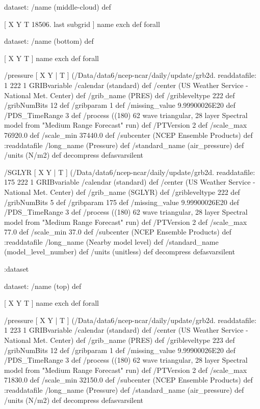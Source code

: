 \begin{ingrid}

 dataset: /name (middle-cloud) def

  [ X Y T 18506. last subgrid ] { name exch def } forall

  dataset: /name (bottom) def

   [ X Y T ] { name exch def } forall

   /pressure { [ X Y | T ] (/Data/data6/ncep-ncar/daily/update/grb2d.%
   readdatafile:
   1 222 1 GRIBvariable
   /calendar (standard) def
   /center (US Weather Service - National Met. Center) def
   /grib_name (PRES) def
   /gribleveltype 222 def
   /gribNumBits 12 def
   /gribparam 1 def
   /missing_value 9.99900026E20 def
   /PDS_TimeRange 3 def
   /process ((180) 62 wave triangular, 28 layer Spectral model from "Medium Range Forecast" run) def
   /PTVersion 2 def
   /scale_max 76920.0 def
   /scale_min 37440.0 def
   /subcenter (NCEP Ensemble Products) def
   :readdatafile
   /long_name (Pressure) def
   /standard_name (air_pressure) def
   /units (N/m2) def
   decompress
   } defasvarsilent

   /SGLYR { [ X Y | T ] (/Data/data6/ncep-ncar/daily/update/grb2d.%
   readdatafile:
   175 222 1 GRIBvariable
   /calendar (standard) def
   /center (US Weather Service - National Met. Center) def
   /grib_name (SGLYR) def
   /gribleveltype 222 def
   /gribNumBits 5 def
   /gribparam 175 def
   /missing_value 9.99900026E20 def
   /PDS_TimeRange 3 def
   /process ((180) 62 wave triangular, 28 layer Spectral model from "Medium Range Forecast" run) def
   /PTVersion 2 def
   /scale_max 77.0 def
   /scale_min 37.0 def
   /subcenter (NCEP Ensemble Products) def
   :readdatafile
   /long_name (Nearby model level) def
   /standard_name (model_level_number) def
   /units (unitless) def
   decompress
   } defasvarsilent

  :dataset

  dataset: /name (top) def

   [ X Y T ] { name exch def } forall

   /pressure { [ X Y | T ] (/Data/data6/ncep-ncar/daily/update/grb2d.%
   readdatafile:
   1 223 1 GRIBvariable
   /calendar (standard) def
   /center (US Weather Service - National Met. Center) def
   /grib_name (PRES) def
   /gribleveltype 223 def
   /gribNumBits 12 def
   /gribparam 1 def
   /missing_value 9.99900026E20 def
   /PDS_TimeRange 3 def
   /process ((180) 62 wave triangular, 28 layer Spectral model from "Medium Range Forecast" run) def
   /PTVersion 2 def
   /scale_max 71830.0 def
   /scale_min 32150.0 def
   /subcenter (NCEP Ensemble Products) def
   :readdatafile
   /long_name (Pressure) def
   /standard_name (air_pressure) def
   /units (N/m2) def
   decompress
   } defasvarsilent


\end{ingrid}
